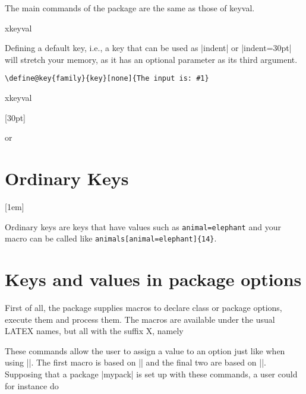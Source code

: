 The main commands of the package are the same as those of keyval. 

\begin{texexample}{xkeyval }{}
\makeatletter
{}
\makeatother
\lorem\par
{}
\lorem\par
\end{texexample}

Defining a default key, i.e., a key that can be used as |indent| or |indent=30pt| will stretch your memory, as it has an optional parameter as its third argument. 

\begin{verbatim}
\define@key{family}{key}[none]{The input is: #1}
\end{verbatim}

\begin{texexample}{xkeyval }{}
\makeatletter

[30pt]{\setlength{\parindent}{#1}}


\lorem

or 

\lorem
\makeatother
\end{texexample}

\section{Ordinary Keys}
\makeatletter
{}[1em]{\setlength{\parindent}{#1}}
\makeatother


Ordinary keys are keys that have values such as \texttt{animal=elephant} and your macro can be called like \texttt{animals[animal=elephant]\{14\}}.

   



\section{Keys and values in package options}

First of all, the package supplies macros to declare class or package options, execute them and process
them. The macros are available under the usual
LATEX names, but all with the suffix X, namely

\begin{macro}{\DeclareOptionX}
\begin{macro}{\DeclareOptionX*}
\begin{macro}{\ExecuteOptionsX}
\begin{macro}{\ProcessOptionsX}
These commands allow the user to assign a value to
an option just like when using |\setkeys|. The first
macro is based on || and the final two
are based on |\setkeys|. Supposing that a package
|mypack| is set up with these commands, a user could
for instance do
\end{macro}
\end{macro}
\end{macro}
\end{macro}

